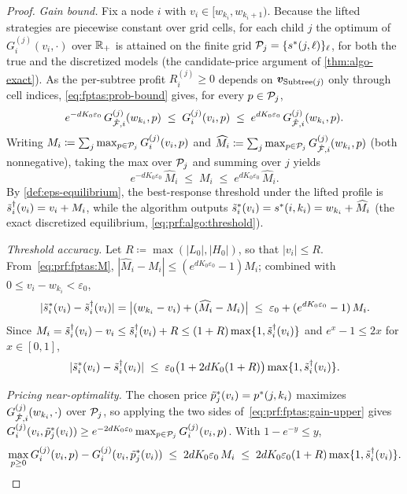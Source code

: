 \begin{proof}
\emph{Gain bound.} Fix a node $i$ with $v_i \in [w_{k_i}, w_{k_i+1})$. Because the lifted strategies are piecewise constant over grid cells, for each child $j$ the optimum of $G^{(j)}_i(v_i, \cdot)$ over $\mathbb{R}_+$ is attained on the finite grid $\mathcal{P}_j = \{s^*(j,\ell)\}_\ell$, for both the true and the discretized models (the candidate-price argument of \cref{thm:algo-exact}). As the per-subtree profit $R^{(j)}_i \ge 0$ depends on ${\bm{v}}_{\operatorname{Subtree}(j)}$ only through cell indices, \eqref{eq:fptas:prob-bound} gives, for every $p \in \mathcal{P}_j$,
\begin{equation}
\label{eq:prf:fptas:gain-upper}
e^{-d K_0 \varepsilon_0}\, G^{(j)}_{\hat{\mathcal{F}},i}(w_{k_i}, p) \;\le\; G^{(j)}_i(v_i, p) \;\le\; e^{d K_0 \varepsilon_0}\, G^{(j)}_{\hat{\mathcal{F}},i}(w_{k_i}, p).
\end{equation}
Writing $M_i \coloneqq \sum_{j} \max_{p \in \mathcal{P}_j} G^{(j)}_i(v_i, p)$ and $\widehat{M}_i \coloneqq \sum_{j} \max_{p \in \mathcal{P}_j} G^{(j)}_{\hat{\mathcal{F}},i}(w_{k_i}, p)$ (both nonnegative), taking the max over $\mathcal{P}_j$ and summing over $j$ yields
\begin{equation}
\label{eq:prf:fptas:M}
e^{-d K_0 \varepsilon_0}\, \widehat{M}_i \;\le\; M_i \;\le\; e^{d K_0 \varepsilon_0}\, \widehat{M}_i .
\end{equation}
By \cref{def:eps-equilibrium}, the best-response threshold under the lifted profile is $\tilde{s}^\dagger_i(v_i) = v_i + M_i$, while the algorithm outputs $\tilde{s}^*_i(v_i) = s^*(i,k_i) = w_{k_i} + \widehat{M}_i$ (the exact discretized equilibrium, \cref{eq:prf:algo:threshold}).

\emph{Threshold accuracy.} Let $R \coloneqq \max(|L_0|, |H_0|)$, so that $|v_i| \le R$. From~\eqref{eq:prf:fptas:M}, $|\widehat{M}_i - M_i| \le (e^{d K_0 \varepsilon_0} - 1) M_i$; combined with $0 \le v_i - w_{k_i} < \varepsilon_0$,
\[
|\tilde{s}^*_i(v_i) - \tilde{s}^\dagger_i(v_i)| = \big|(w_{k_i} - v_i) + (\widehat{M}_i - M_i)\big| \;\le\; \varepsilon_0 + (e^{d K_0 \varepsilon_0} - 1)\, M_i .
\]
Since $M_i = \tilde{s}^\dagger_i(v_i) - v_i \le \tilde{s}^\dagger_i(v_i) + R \le (1+R)\max\{1, \tilde{s}^\dagger_i(v_i)\}$ and $e^x - 1 \le 2x$ for $x \in [0,1]$,
\[
|\tilde{s}^*_i(v_i) - \tilde{s}^\dagger_i(v_i)| \;\le\; \varepsilon_0\big(1 + 2 d K_0 (1+R)\big)\max\{1, \tilde{s}^\dagger_i(v_i)\}.
\]

\emph{Pricing near-optimality.} The chosen price $\tilde{p}^*_j(v_i) = p^*(j,k_i)$ maximizes $G^{(j)}_{\hat{\mathcal{F}},i}(w_{k_i}, \cdot)$ over $\mathcal{P}_j$, so applying the two sides of~\eqref{eq:prf:fptas:gain-upper} gives $G^{(j)}_i(v_i, \tilde{p}^*_j(v_i)) \ge e^{-2 d K_0 \varepsilon_0} \max_{p \in \mathcal{P}_j} G^{(j)}_i(v_i, p)$. With $1 - e^{-y} \le y$,
\[
\max_{p \ge 0} G^{(j)}_i(v_i, p) - G^{(j)}_i(v_i, \tilde{p}^*_j(v_i)) \;\le\; 2 d K_0 \varepsilon_0\, M_i \;\le\; 2 d K_0 \varepsilon_0 (1+R)\max\{1, \tilde{s}^\dagger_i(v_i)\}.
\]


\end{proof}
